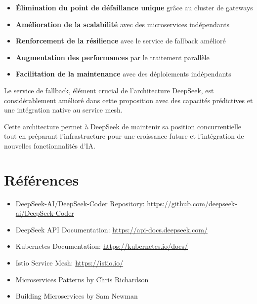 \documentclass[12pt,a4paper]{article}
\begin{document}
\begin{itemize}
    \item \textbf{Élimination du point de défaillance unique} grâce au cluster de gateways
    \item \textbf{Amélioration de la scalabilité} avec des microservices indépendants
    \item \textbf{Renforcement de la résilience} avec le service de fallback amélioré
    \item \textbf{Augmentation des performances} par le traitement parallèle
    \item \textbf{Facilitation de la maintenance} avec des déploiements indépendants
\end{itemize}

Le service de fallback, élément crucial de l'architecture DeepSeek, est considérablement amélioré dans cette proposition avec des capacités prédictives et une intégration native au service mesh.

Cette architecture permet à DeepSeek de maintenir sa position concurrentielle tout en préparant l'infrastructure pour une croissance future et l'intégration de nouvelles fonctionnalités d'IA.

\section{Références}

\begin{itemize}
    \item DeepSeek-AI/DeepSeek-Coder Repository: \url{https://github.com/deepseek-ai/DeepSeek-Coder}
    \item DeepSeek API Documentation: \url{https://api-docs.deepseek.com/}
    \item Kubernetes Documentation: \url{https://kubernetes.io/docs/}
    \item Istio Service Mesh: \url{https://istio.io/}
    \item Microservices Patterns by Chris Richardson
    \item Building Microservices by Sam Newman
\end{itemize}
\end{document}

